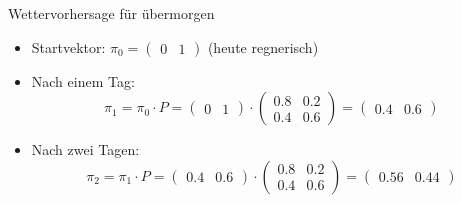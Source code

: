 \begin{frame}{Wettervorhersage für übermorgen}
    \footnotesize
    \begin{itemize}[<+->]
        \item Startvektor: \(\pi_0 = \begin{pmatrix} 0 & 1 \end{pmatrix}\) \hspace{0.5em} (heute regnerisch)
        \item Nach einem Tag:
              \[
                  \pi_1 = \pi_0 \cdot P = \begin{pmatrix} 0 & 1 \end{pmatrix} \cdot \begin{pmatrix} 0.8 & 0.2 \\ 0.4 & 0.6 \end{pmatrix} = \begin{pmatrix} 0.4 & 0.6 \end{pmatrix}
              \]
        \item Nach zwei Tagen:
              \[
                  \pi_2 = \pi_1 \cdot P = \begin{pmatrix} 0.4 & 0.6 \end{pmatrix} \cdot \begin{pmatrix} 0.8 & 0.2 \\ 0.4 & 0.6 \end{pmatrix} = \begin{pmatrix} 0.56 & 0.44 \end{pmatrix}
              \]
    \end{itemize}

\end{frame}
